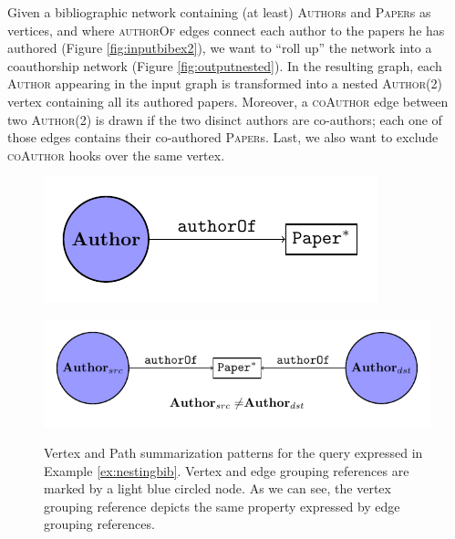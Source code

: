 \begin{example}
	\label{ex:nestingbib}
	Given a bibliographic network containing (at least) \textsc{Author}s and \textsc{Paper}s as vertices, and where \textsc{authorOf} edges connect each author to the papers he has authored (Figure \ref{fig:inputbibex2}), we want to ``roll up'' the network into a coauthorship network (Figure \ref{fig:outputnested}). In the resulting graph, each \textsc{Author} appearing in the input graph is transformed into a nested \textsc{Author}(2) vertex containing all its authored papers. Moreover, a \textsc{coAuthor} edge between two  \textsc{Author}(2) is drawn if the two disinct authors are co-authors; each one of those edges contains their co-authored \textsc{Paper}s. Last, we also want to exclude \textsc{coAuthor} hooks over the same vertex.
	
	
\begin{figure}[!t]
	\centering
	\begin{minipage}[!t]{0.5\textwidth}
		\centering
		\includegraphics[width=.6\textwidth]{images/nesting/patterns/00_vertex_pattern.pdf}
		\label{fig:vertexPat}
	\end{minipage} \begin{minipage}[!t]{0.4\textwidth}
		\centering
		\includegraphics[width=1\textwidth]{00_path_pattern.pdf}
		\label{fig:pathPat}
	\end{minipage}
	\caption{Vertex and Path summarization patterns for the query expressed in Example \ref{ex:nestingbib}. Vertex and edge grouping references are marked by a light blue circled node. As we can see, the vertex grouping reference depicts the same property expressed by edge grouping references.}

\end{figure}
\end{example}
